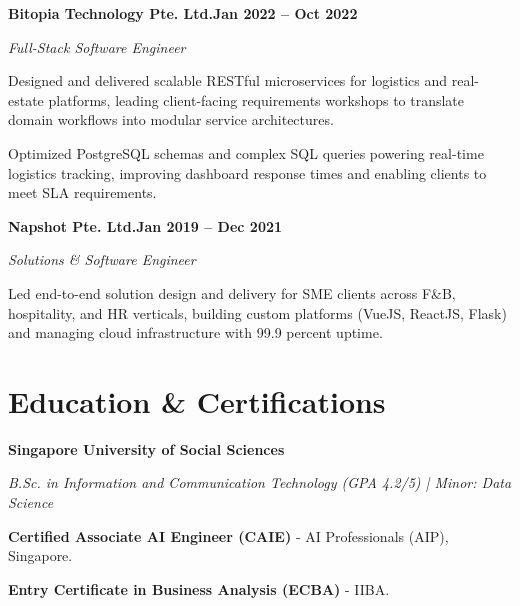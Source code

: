 \documentclass[letterpaper,10pt]{article}
\newcommand{\headingBf}[2]{\par\noindent\hspace*{10pt}\textbf{#1}\hfill\textbf{#2}}
\newcommand{\headingIt}[2]{\par\noindent\hspace*{10pt}\textit{#1}\hfill\textit{#2}}
\newenvironment{resume_list}{\vspace{-7pt}\begin{itemize}[itemsep=-2px, parsep=1pt, leftmargin=30pt]}{\end{itemize}}
\begin{document}
  \headingBf{Bitopia Technology Pte. Ltd.}{Jan 2022 -- Oct 2022}
  \headingIt{Full-Stack Software Engineer}{}
  \begin{resume_list}
    \item Designed and delivered scalable RESTful microservices for logistics and real-estate platforms, leading client-facing requirements workshops to translate domain workflows into modular service architectures.
    \item Optimized PostgreSQL schemas and complex SQL queries powering real-time logistics tracking, improving dashboard response times and enabling clients to meet SLA requirements.
  \end{resume_list}

  \headingBf{Napshot Pte. Ltd.}{Jan 2019 -- Dec 2021}
  \headingIt{Solutions \& Software Engineer}{}
  \begin{resume_list}
    \item Led end-to-end solution design and delivery for SME clients across F\&B, hospitality, and HR verticals, building custom platforms (VueJS, ReactJS, Flask) and managing cloud infrastructure with 99.9 percent uptime.
  \end{resume_list}

  \section{Education \& Certifications}
  \headingBf{Singapore University of Social Sciences}{}
  \headingIt{B.Sc. in Information and Communication Technology (GPA 4.2/5) | Minor: Data Science}{}
  \begin{resume_list}
    \item \textbf{Certified Associate AI Engineer (CAIE)} - AI Professionals (AIP), Singapore.
    \item \textbf{Entry Certificate in Business Analysis (ECBA)} - IIBA.
  \end{resume_list}
\end{document}
